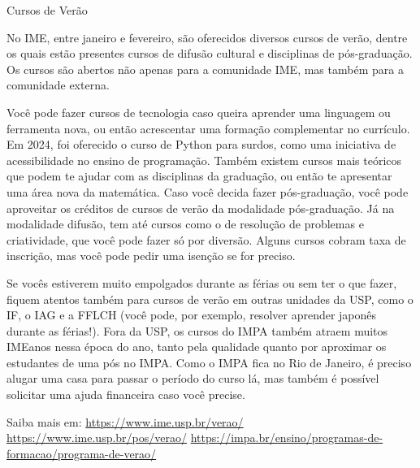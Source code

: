 \begin{secao}{Cursos de Verão}

No IME, entre janeiro e fevereiro, são oferecidos diversos cursos de verão,
dentre os quais estão presentes cursos de difusão cultural e disciplinas de
pós-graduação. Os cursos são abertos não apenas para a comunidade IME, mas
também para a comunidade externa.

Você pode fazer cursos de tecnologia caso queira aprender uma linguagem ou 
ferramenta nova, ou então acrescentar uma formação complementar no currículo. 
Em 2024, foi oferecido o curso de Python para surdos, como uma iniciativa de 
acessibilidade no ensino de programação. Também existem cursos mais teóricos que 
podem te ajudar com as disciplinas da graduação, ou então te apresentar uma área
nova da matemática. Caso você decida fazer pós-graduação, você pode aproveitar os 
créditos de cursos de verão da modalidade pós-graduação. Já na modalidade difusão, tem até cursos como
o de resolução de problemas e criatividade, que você pode fazer só por diversão. 
Alguns cursos cobram taxa de inscrição, mas você pode pedir uma isenção se for preciso. 

Se vocês estiverem muito empolgados durante as férias ou sem ter o que fazer, 
fiquem atentos também para cursos de verão em outras unidades da USP, como o IF, o IAG 
e a FFLCH (você pode, por exemplo, resolver aprender japonês durante as férias!). Fora da 
USP, os cursos do IMPA também atraem muitos IMEanos nessa época do ano, tanto pela qualidade 
quanto por aproximar os estudantes de uma pós no IMPA. Como o IMPA fica no Rio de Janeiro, 
é preciso alugar uma casa para passar o período do curso lá, mas também é possível solicitar 
uma ajuda financeira caso você precise.


Saiba mais em: 
\url{https://www.ime.usp.br/verao/}
\url{https://www.ime.usp.br/pos/verao/}
\url{https://impa.br/ensino/programas-de-formacao/programa-de-verao/}

\end{secao}
